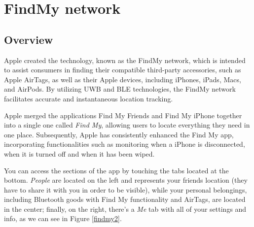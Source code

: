\documentclass[english]{article}
\begin{document}
\section{FindMy network}\label{sec:find}
\subsection{Overview}
Apple created the technology, known as the FindMy network, which is intended to assist consumers in finding their compatible third-party accessories, such as Apple AirTags, as well as their Apple devices, including iPhones, iPads, Macs, and AirPods. By utilizing UWB and BLE technologies, the FindMy network facilitates accurate and instantaneous location tracking.

Apple merged the applications Find My Friends and Find My iPhone together into a single one called \textit{Find My}, allowing users to locate everything they need in one place. Subsequently, Apple has consistently enhanced the Find My app, incorporating functionalities such as monitoring when a iPhone is disconnected, when it is turned off and when it has been wiped.

You can access the sections of the app by touching the tabs located at the bottom. \textit{People} are located on the left and represents your friends location (they have to share it with you in order to be visible), while your personal belongings, including Bluetooth goods with Find My functionality and AirTags, are located in the center; finally, on the right, there's a \textit{Me} tab with all of your settings and info, as we can see in Figure \ref{findmy2}.
\end{document}
